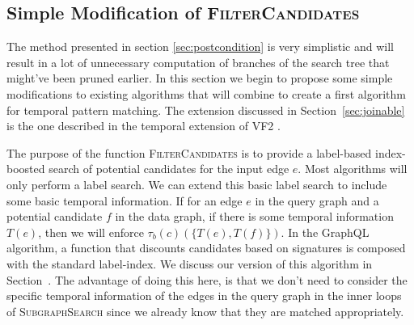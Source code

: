 \subsection{Simple Modification of \textsc{FilterCandidates}}
\label{sec:naive_filter_candidates}

The method presented in section \ref{sec:postcondition} is very simplistic and
will result in a lot of unnecessary computation of branches of the search tree
that might've been pruned earlier. In this section we begin to propose some
simple modifications to existing algorithms that will combine to create a first
algorithm for temporal pattern matching. The extension discussed in
Section~\ref{sec:joinable} is the one described in the temporal extension of VF2
\cite{2012-arXiv-TemporalIso}.

The purpose of the function \textsc{FilterCandidates} is to provide a
label-based index-boosted search of potential candidates for the input edge
$e$. Most algorithms will only perform a label search. We can
extend this basic label search to include some basic temporal information. If
for an edge $e$ in the query graph and a potential candidate $f$ in the data
graph, if there is some temporal information $T(e)$, then we will enforce
$\tau_b(c)(\{T(e), T(f)\})$. In the GraphQL algorithm, a function that discounts
candidates based on signatures is composed with the standard label-index. We
discuss our version of this algorithm in Section~\cite{sec:encoding}. The
advantage of doing this here, is that we don't need to consider the specific
temporal information of the edges in the query graph in the inner loops of
\textsc{SubgraphSearch} since we already know that they are matched
appropriately.


